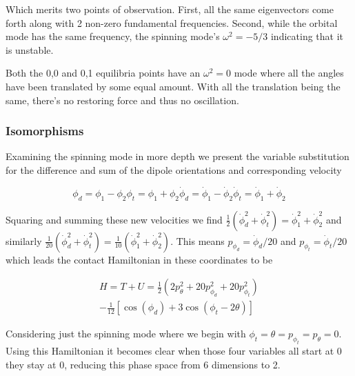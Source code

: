 \documentclass[prbg,preprint]{revtex4-1}
\begin{document}
Which merits two points of observation. First, all the same eigenvectors come forth along with 2 non-zero fundamental frequencies. Second, while the orbital mode has the same frequency, the spinning mode's $\omega^2=-5/3$ indicating that it is unstable.

Both the 0,0 and 0,1 equilibria points have an $\omega^2=0$ mode where all the angles have been translated by some equal amount. With all the translation being the same, there's no restoring force and thus no oscillation.


\subsubsection{Isomorphisms} Examining the spinning mode in more depth we present the variable substitution for the difference and sum of the dipole orientations and corresponding velocity

\begin{subequations}
	\begin{equation}
		\phi_d = \phi_1-\phi_2
	\end{equation}
	\begin{equation}
		\phi_t = \phi_1+\phi_2
	\end{equation}
	\begin{equation}
		\dot\phi_d = \dot\phi_1-\dot\phi_2
	\end{equation}
	\begin{equation}
		\dot\phi_t = \dot\phi_1+\dot\phi_2
	\end{equation}
\end{subequations}

Squaring and summing these new velocities we find 
$\frac{1}{2}(\dot\phi_d^2 + \dot\phi_t^2) = \dot\phi_1^2+\dot\phi_2^2$ and similarly $\frac{1}{20}(\dot\phi_d^2 + \dot\phi_t^2) = \frac{1}{10}(\dot\phi_1^2+\dot\phi_2^2)$.
This means $p_{\phi_d}=\dot\phi_d/20$ and $p_{\phi_t}=\dot\phi_t/20$ which leads the contact Hamiltonian in these coordinates to be

\begin{equation}
  \begin{multlined}
	H=T+U=
	\frac{1}{2}\left (
	2 p_\theta^2
	+20 p_{\phi_d}^2 
	+20 p_{\phi_t}^2      
        \right )
        \\
	-
	\frac{1}{12}
	[
	        \cos(\phi_d)
	        +3\cos(\phi_t-2\theta)
	    ]
  \end{multlined}
\end{equation}

Considering just the spinning mode where we begin with $\phi_t=\theta=p_{\phi_t}=p_\theta=0$. Using this Hamiltonian it becomes clear when those four variables all start at 0 they stay at 0, reducing this phase space from 6 dimensions to 2.
\end{document}
